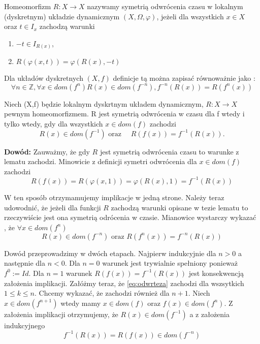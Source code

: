 \begin{definition}
  Homeomorfizm $ R: X \to X $ nazywamy symetrią odwrócenia czasu w lokalnym (dyskretnym) układzie dynamicznym $ (X,\Omega,\varphi)$,
  jeżeli dla wszystkich $ x \in X $ oraz $ t \in I_x $ zachodzą warunki 
  \begin{enumerate}
   \item $ -t \in I_{R(x)}$,
   \item $ R(\varphi(x,t)) = \varphi(R(x), -t)$
  \end{enumerate}

\end{definition}

Dla układów dyskretnych $(X,f) $ definicje tą można zapisać równoważnie jako :
  $$
   \forall n \in \mathbb Z, \forall x \in dom(f^n) R(x) \in dom(f^{-n}), f^{-n}(R(x)) = R(f^n(x))
  $$

\begin{lemma}
  \label{lem:reversedTime}
   Niech (X,f) będzie lokalnym dyskrtnym układem dynamicznym, $ R : X\to X $ pewnym homeomorfizmem. R jest 
   symetrią odwrócenia w czasu dla f wtedy i tylko wtedy, gdy dla wszystkich $ x \in dom(f) $ zachodzi
   \begin{equation}
       R(x) \in dom(f^{-1}) \mbox{ oraz } \quad R(f(x)) = f^{-1}(R(x)).
   \end{equation}

\end{lemma}

\textbf{Dowód:}
  Zauważmy, że gdy $R$ jest symetrią odwrócenia czasu to warunke z lematu zachodzi. Minowicie z definicji
  symetri odwrócenia dla $ x \in dom(f) $ zachodzi 
    \begin{equation}
	R(f(x)) = R(\varphi(x,1)) = \varphi(R(x),1) = f^{-1}(R(x))
    \end{equation}

    W ten sposób otrzymamujemy implikacje w jedną strone. Należy teraz udowodnić, że jeżeli dla funkcji $ R $ 
    zachodzą warunki opisane w tezie lematu to rzeczywiście jest ona symetrią odrócenia w czasie.
    Mianowice wystarczy wykazać , że $ \forall x \in dom(f^n) $
    \begin{equation}
      \label{eq:odwrteza}
       R(x) \in dom(f^{-n}) \mbox{ oraz } R(f^n(x)) = f^{-n}(R(x))
    \end{equation}

    Dowód przeprowadzimy w dwóch etapach. Najpierw indukcyjnie dla $ n > 0 $ a następnie dla $ n < 0 $.
    Dla $ n = 0 $ warunek jest trywialnie spełniony ponieważ $ f^0 := Id $.
    Dla $ n = 1 $ warunek $ R(f(x)) = f^{-1}(R(x)) $ jest konsekwencją założenia implikacji.
    Załóżmy teraz, że \eqref{eq:odwrteza} zachodzi dla wszsytkich $ 1 \leq k \leq n $. Chcemy wykazać, że 
    zachodzi również dla $ n+1$.
    Niech $ x \in dom(f^{n+1}) $ wtedy mamy $ x \in dom(f) $ oraz $ f(x) \in dom(f^n) $. Z założenia 
    implikacji otrzymujemy, że $ R(x) \in dom(f^{-1})$ a z założenia indukcyjnego 
      $$
	f^{-1}(R(x)) = R(f(x)) \in dom(f^{-n})
      $$
      
